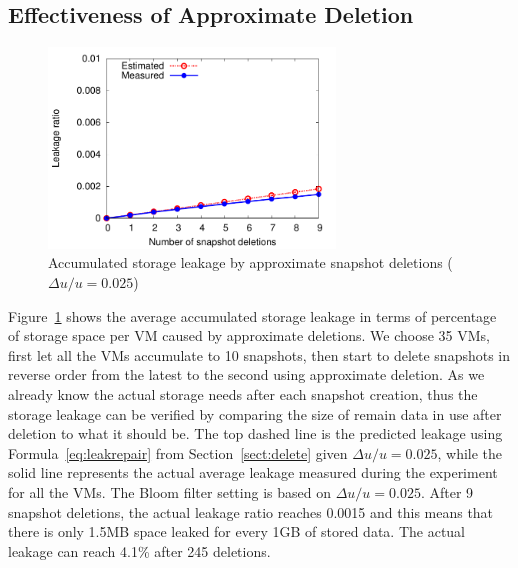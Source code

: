  \subsection{Effectiveness of Approximate Deletion}

 \begin{figure}
\vspace{-0.1in}
     \centering
     \includegraphics[width=3in]{figures/leakage}
     \caption{Accumulated storage leakage by approximate snapshot deletions ($\Delta u/u=0.025$)}
     \label{fig:leakage}
 \end{figure}

Figure~\ref{fig:leakage} shows the average accumulated storage leakage in terms of percentage of
storage space per VM caused  by approximate deletions.
We choose 35 VMs, first let all the VMs accumulate to 10 snapshots, then start to delete snapshots
in reverse order from the latest to the second using approximate deletion.
As we already know the actual storage needs after each snapshot creation,
thus the storage leakage can be verified by
comparing the size of remain data in use after deletion to what it should be.
The top dashed line is the predicted leakage using Formula~\ref{eq:leakrepair} from Section~\ref{sect:delete}
given $\Delta u/u=0.025$,
while the solid line represents the actual average leakage measured during the experiment for all the VMs. 
The Bloom filter setting is based on $\Delta u/u=0.025$.
After 9 snapshot deletions, the actual leakage ratio reaches 0.0015 and this means that
there is only 1.5MB space leaked for every 1GB of stored data.
The actual leakage can reach  4.1\% after  245 deletions.
